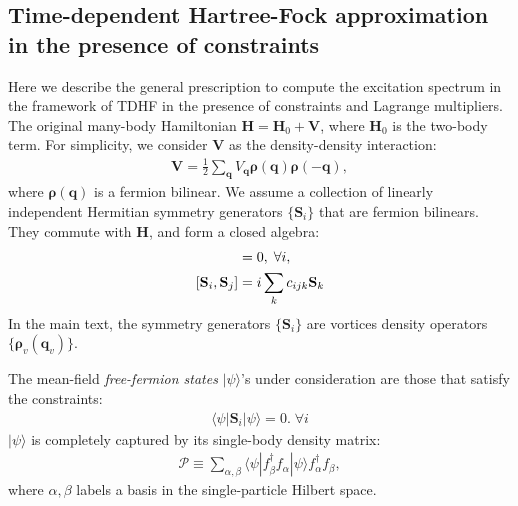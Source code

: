\begin{subappendices}
    \section{Time-dependent Hartree-Fock approximation in the presence of constraints}\label{app:TDHF}
    Here we describe the general prescription to compute the excitation spectrum in the framework of TDHF in the presence of constraints and Lagrange multipliers. The original many-body Hamiltonian $\mathbf H=\mathbf H_0+\mathbf V$, where $\mathbf H_0$ is the two-body term. For simplicity, we consider $\mathbf V$ as the density-density interaction:
    \begin{align}
        \mathbf V=\frac{1}{2}\sum_{\mathbf q} V_{\mathbf q} \pmb{\boldsymbol\rho}(\mathbf q)\pmb{\boldsymbol\rho}(-\mathbf q),
    \end{align}
    where $\pmb{\boldsymbol\rho}(\mathbf q)$ is a fermion bilinear. We assume a collection of linearly independent Hermitian symmetry generators $\{\mathbf S_i\}$ that are fermion bilinears. They commute with $\mathbf H$, and form a closed algebra:
    \begin{align}
        [\mathbf S_i,\mathbf H]   & =0,\;\forall i,\notag                             \\
        [\mathbf S_i,\mathbf S_j] & =i\sum_{k} c_{ijk}\mathbf S_k\label{eq:S_algebra}
    \end{align}
    In the main text, the symmetry generators $\{\mathbf S_i\}$ are vortices density operators $\{\pmb{\boldsymbol\rho}_v(\mathbf q_v)\}$.

    The mean-field \emph{free-fermion states} $|\psi\rangle$'s under consideration are those that satisfy the constraints:
    \begin{align}
        \langle \psi |\mathbf S_i| \psi\rangle =0.\;\forall i\label{eq:S_constraints}
    \end{align}
    $|\psi\rangle$ is completely captured by its single-body density matrix:
    \begin{align}
        \boldsymbol{\mathcal P}\equiv \sum_{\alpha,\beta}\langle \psi| f_{\beta}^\dagger f_{\alpha}|\psi\rangle f_{\alpha}^\dagger f_{\beta},
    \end{align}
    where $\alpha,\beta$ labels a basis in the single-particle Hilbert space.


\end{subappendices}
